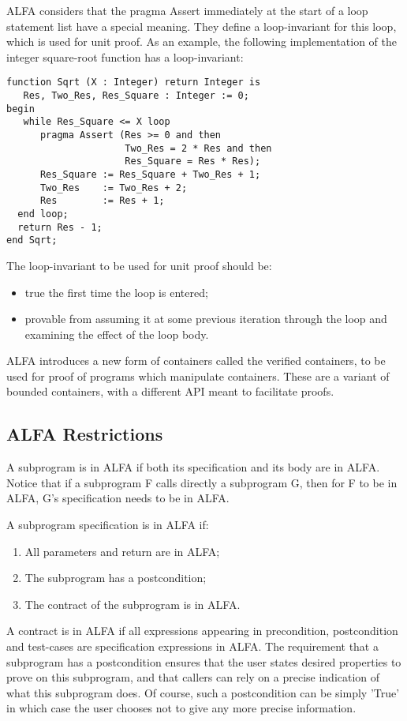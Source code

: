 \documentclass{article}
\begin{document}
ALFA considers that the pragma Assert immediately at the start of a loop
statement list have a special meaning. They define a loop-invariant for this
loop, which is used for unit proof.  As an example, the following
implementation of the integer square-root function has a loop-invariant:

\begin{verbatim}
function Sqrt (X : Integer) return Integer is
   Res, Two_Res, Res_Square : Integer := 0;
begin
   while Res_Square <= X loop
      pragma Assert (Res >= 0 and then
                     Two_Res = 2 * Res and then
                     Res_Square = Res * Res);
      Res_Square := Res_Square + Two_Res + 1;
      Two_Res    := Two_Res + 2;
      Res        := Res + 1;
  end loop;
  return Res - 1;
end Sqrt;
\end{verbatim}

The loop-invariant to be used for unit proof should be:
\begin{itemize}
\item true the first time the loop is entered;
\item provable from assuming it at some previous iteration through the loop and
  examining the effect of the loop body.
\end{itemize}

ALFA introduces a new form of containers called the verified containers, to be
used for proof of programs which manipulate containers. These are a variant of
bounded containers, with a different API meant to facilitate proofs.

\subsection{ALFA Restrictions}

A subprogram is in ALFA if both its specification and its body are in
ALFA. Notice that if a subprogram F calls directly a subprogram G, then for F
to be in ALFA, G's specification needs to be in ALFA.

A subprogram specification is in ALFA if:
\begin{enumerate}
\item All parameters and return are in ALFA;
\item The subprogram has a postcondition;
\item The contract of the subprogram is in ALFA.
\end{enumerate}

A contract is in ALFA if all expressions appearing in precondition,
postcondition and test-cases are specification expressions in ALFA. The
requirement that a subprogram has a postcondition ensures that the user states
desired properties to prove on this subprogram, and that callers can rely on a
precise indication of what this subprogram does. Of course, such a
postcondition can be simply 'True' in which case the user chooses not to give
any more precise information.
\end{document}
